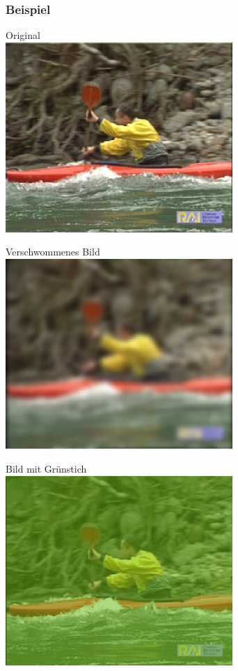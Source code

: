 \documentclass[t]{beamer}
\begin{document}
\begin{frame}
	\frametitle{Beispiel}

	\begin{center}
		Original ~\\
		\includegraphics[scale=.45]{rafting-original.png}	
	\end{center}
	\begin{minipage}{5cm}
		\begin{center}
			Verschwommenes Bild ~\\
			\includegraphics[scale=.45]{rafting-blur.png}		
		\end{center}	
	\end{minipage}
	\hfill
	\begin{minipage}{5cm}
		\begin{center}
			Bild mit Grünstich ~\\
			\includegraphics[scale=.45]{rafting-green.png}
		\end{center}	
	\end{minipage}
	\hfill
\end{frame}
\end{document}
